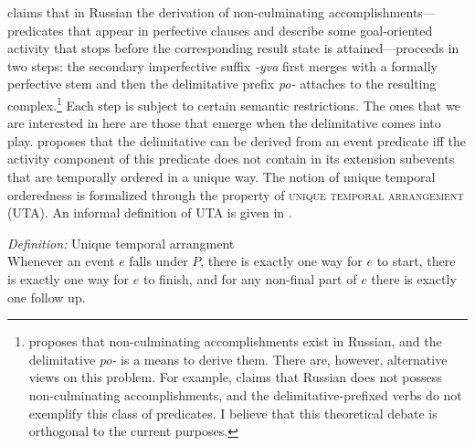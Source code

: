 \documentclass[output=paper,
]{langscibook}
\begin{document}
\citet{tatevosov2017temporal} claims that in Russian the derivation of non-culminating accom\-plish\-ments—predicates that appear in perfective clauses and describe some goal-oriented activity that stops before the corresponding result state is attained—proceeds in two steps: the secondary imperfective suffix \textit{-yva} first merges with a formally perfective stem and then the delimitative prefix \textit{po-} attaches to the resulting complex.\footnote{\citet{tatevosov2017temporal} proposes that non-culminating accomplishments exist in Russian, and the delimitative \textit{po-} is a means to derive them. There are, however, alternative views on this problem. For example, \citet{martin2017non} claims that Russian does not possess non-culminating accomplishments, and the delimitative-prefixed verbs do not exemplify this class of predicates. I believe that this theoretical debate is orthogonal to the current purposes.} Each step is subject to certain semantic restrictions. The ones that we are interested in here are those that emerge when the delimitative comes into play. \citet{tatevosov2017temporal} proposes that the delimitative can be derived from an event predicate iff the activity component of this predicate does not contain in its extension subevents that are temporally ordered in a unique way. The notion of unique temporal orderedness is formalized through the property of \textsc{unique temporal arrangement} (UTA). An informal definition of UTA is given in .

\eanoraggedright \textit{Definition:} Unique temporal arrangment\smallskip\\
Whenever an event $e$ falls under $P$, there is exactly one way for $e$ to start, there is exactly one way for $e$ to finish, and for any non-final part of $e$ there is exactly one follow up.\label{ex:naumov:22}
\z
\end{document}

